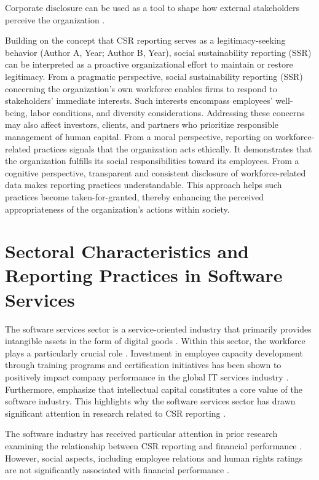 Corporate disclosure can be used as a tool to shape how external stakeholders perceive the organization \parencite[p.~11]{Deegan2002}.

Building on the concept that CSR reporting serves as a legitimacy-seeking behavior (Author A, Year; Author B, Year), 
social sustainability reporting (SSR) can be interpreted as a proactive organizational effort to maintain or restore legitimacy.
From a pragmatic perspective, social sustainability reporting (SSR) concerning the organization's own workforce enables firms 
to respond to stakeholders' immediate interests. Such interests encompass employees' well-being, labor conditions, and diversity
considerations. Addressing these concerns may also affect investors, clients, and partners who prioritize responsible management 
of human capital. From a moral perspective, reporting on workforce-related practices signals that the organization acts ethically. 
It demonstrates that the organization fulfills its social responsibilities toward its employees.
From a cognitive perspective, transparent and consistent disclosure of workforce-related data makes reporting practices 
understandable. This approach helps such practices become taken-for-granted, thereby enhancing the perceived appropriateness 
of the organization's actions within society.

\section{Sectoral Characteristics and Reporting Practices in Software Services}

The software services sector is a service-oriented industry that primarily provides intangible assets 
in the form of digital goods \parencite{Buxmann2015}. Within this sector, the workforce plays a particularly 
crucial role \parencite{Buxmann2015}. Investment in employee capacity development through training programs 
and certification initiatives has been shown to positively impact company performance in the global IT 
services industry \parencite{Chatterjee2017}. Furthermore, \textcite{Nowak2000} emphasize that intellectual 
capital constitutes a core value of the software industry. This highlights why the software services sector 
has drawn significant attention in research related to CSR reporting \parencite{Holder-Webb2009}.

The software industry has received particular attention in prior research examining the relationship 
between CSR reporting and financial performance \parencite{Okafor2021}.
However, social aspects, including employee relations and human rights ratings are not significantly associated 
with financial performance \parencite{Okafor2021}.

